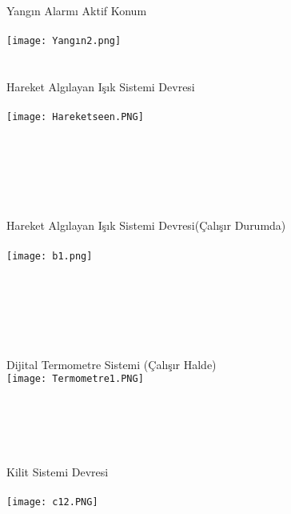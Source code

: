\documentclass[conference]{IEEEtran}
\begin{document}
    Yangın Alarmı Aktif Konum\\ \\
   \texttt{[image: Yangın2.png]}\\\\ \\ 
    
   
   Hareket Algılayan Işık Sistemi Devresi\\ \\
     \texttt{[image: Hareketseen.PNG]}\\ \\ \\ \\ \\
     \\ \\
     
     Hareket Algılayan Işık Sistemi Devresi(Çalışır Durumda)\\ \\
     \texttt{[image: b1.png]}\\ 
    \\
    \\
    \\
    \\ \\ \\
     
     
     
     Dijital Termometre Sistemi (Çalışır Halde)\\ 
     
      \texttt{[image: Termometre1.PNG]}\\ \\ \\
      \\ \\
      \\
     
      
     Kilit Sistemi Devresi\\ \\
      \texttt{[image: c12.PNG]}\\ \\
     \\ \\ \\
     
     
     
\end{document}
